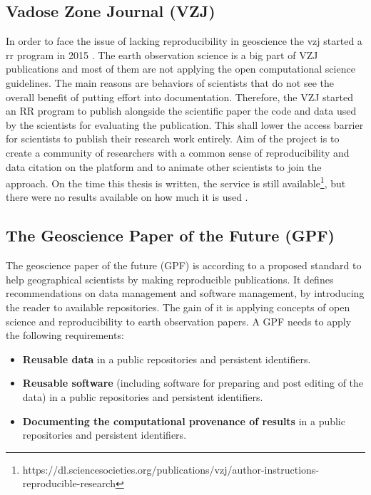 \documentclass[draft,final]{vutinfth} %
\begin{document}
\subsection{Vadose Zone Journal (VZJ)}\label{VZJ}
In order to face the issue of lacking reproducibility in geoscience the \gls{vzj} started a \gls{rr} program in 2015 \cite{doi:10.2136/vzj2015.06.0088}. 
The earth observation science is a big part of VZJ publications and most of them are not applying the open computational science guidelines. The main reasons are behaviors of scientists that do not see the overall benefit of putting effort into documentation. Therefore, the VZJ started an RR program to publish alongside the scientific paper the code and data used by the scientists for evaluating the publication. This shall lower the access barrier for scientists to publish their research work entirely. Aim of the project is to create a community of researchers with a common sense of reproducibility and data citation on the platform and to animate other scientists to join the approach. On the time this thesis is written, the service is still available\footnote{https://dl.sciencesocieties.org/publications/vzj/author-instructions-reproducible-research}, but there were no results available on how much it is used \cite{doi:10.2136/vzj2015.06.0088}.

\subsection{The Geoscience Paper of the Future (GPF)}\label{GPF}

The geoscience paper of the future (GPF) is according to \cite{Gil2016TowardTG} a proposed standard to help geographical scientists by making reproducible publications. It defines recommendations on data management and software management, by introducing the reader to available repositories. The gain of it is applying concepts of open science and reproducibility to earth observation papers. A GPF needs to apply the following requirements:

\begin{itemize}
	\item \textbf{Reusable data} in a public repositories and persistent identifiers.
	\item \textbf{Reusable software} (including software for preparing and post editing of the data) in a  public repositories and persistent identifiers.
	\item \textbf{Documenting the computational provenance of results} in a public repositories and persistent identifiers.  
\end{itemize}
\end{document}
